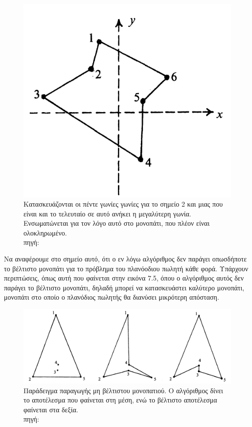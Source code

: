 \documentclass[oneside,12pt]{book}
\newenvironment{matlab}
	{\begin{figure}[hp]\centering\captionsetup{justification=centering}}
	{\end{figure}}
\theoremstyle{definition}
\begin{document}
\begin{matlab}
	\includegraphics[scale=0.5]{images/geometric_approach_angle4.png}
	\caption{Κατασκευάζονται οι πέντε γωνίες γωνίες για το σημείο 2 και μιας που είναι και το τελευταίο σε αυτό ανήκει η μεγαλύτερη γωνία. Ενσωματώνεται για τον λόγο αυτό στο  μονοπάτι, που πλέον είναι ολοκληρωμένο. \\ πηγή: \cite{16}}
\end{matlab}

Να αναφέρουμε στο σημείο αυτό, ότι ο εν λόγω αλγόριθμος δεν παράγει οπωσδήποτε το βέλτιστο μονοπάτι για το πρόβλημα του πλανόοδιου πωλητή κάθε φορά. Υπάρχουν περιπτώσεις, όπως αυτή που φαίνεται στην εικόνα 7.5, όπου ο αλγόριθμος αυτός δεν παράγει το βέλτιστο μονοπάτι, δηλαδή μπορεί να κατασκευάστει καλύτερο μονοπάτι, μονοπάτι στο οποίο ο πλανόδιος πωλητής θα διανύσει μικρότερη απόσταση. \\

\begin{matlab}
	\includegraphics[scale=0.3]{images/geometric_approach_angle5.png}
	\caption{Παράδειγμα παραγωγής μη βέλτιστου μονοπατιού. Ο αλγόριθμος δίνει το αποτέλεσμα που φαίνεται στη μέση, ενώ το βέλτιστο αποτέλεσμα φαίνεται στα δεξία.\\ πηγή: \cite{16}}
\end{matlab}
\end{document}
